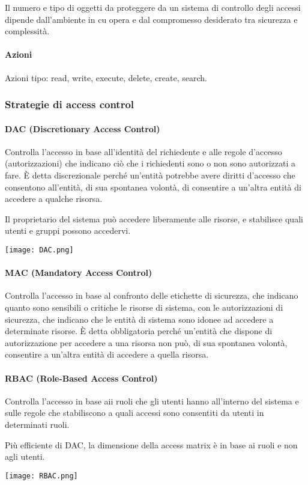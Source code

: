 \documentclass[11pt]{article}
\begin{document}
Il numero e tipo di oggetti da proteggere da un sistema di controllo degli accessi dipende dall'ambiente in cu opera e dal 
compromesso desiderato tra sicurezza e complessità.
\paragraph*{Azioni}
Azioni tipo: read, write, execute, delete, create, search.
\subsubsection{Strategie di access control}
\paragraph*{DAC (Discretionary Access Control)}
Controlla l'accesso in base all'identità del richiedente e alle regole d'accesso (autorizzazioni) che indicano ciò che i
richiedenti sono o non sono autorizzati a fare. È detta discrezionale perché un'entità potrebbe avere diritti d'accesso 
che consentono all'entità, di sua spontanea volontà, di consentire a un'altra entità di accedere a qualche risorsa.

Il proprietario del sistema può accedere liberamente alle risorse, e stabilisce quali utenti e gruppi possono accedervi.
\begin{center}
    \texttt{[image: DAC.png]}
\end{center}
\paragraph*{MAC (Mandatory Access Control)}
Controlla l'accesso in base al confronto delle etichette di sicurezza, che indicano quanto sono sensibili o critiche le 
risorse di sistema, con le autorizzazioni di sicurezza, che indicano che le entità di sistema sono idonee ad accedere a 
determinate risorse. È detta obbligatoria perché un'entità che dispone di autorizzazione per accedere a una risorsa non 
può, di sua spontanea volontà, consentire a un'altra entità di accedere a quella risorsa. 
\paragraph*{RBAC (Role-Based Access Control)}
Controlla l'accesso in base aii ruoli che gli utenti hanno all'interno del sistema e sulle regole che stabiliscono a 
quali accessi sono consentiti da utenti in determinati ruoli.

Più efficiente di DAC, la dimensione della access matrix è in base ai ruoli e non agli utenti.
\begin{center}
    \texttt{[image: RBAC.png]}
\end{center}
\end{document}
